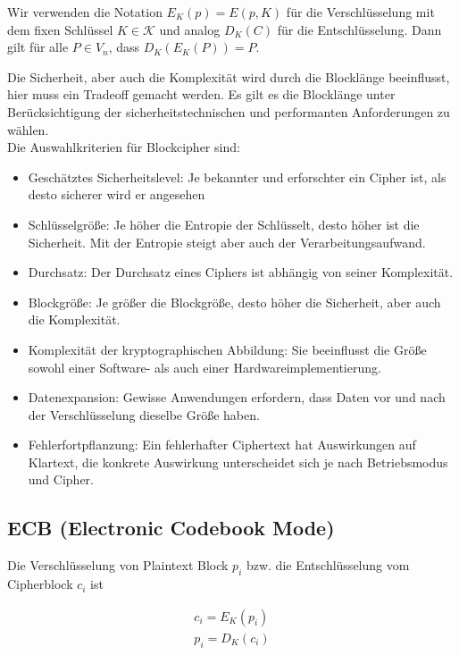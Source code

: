 Wir verwenden die Notation $E_K(p) = E(p, K)$ für die Verschlüsselung mit dem fixen Schlüssel $K \in \mathcal{K}$ und analog $D_K(C)$ für die Entschlüsselung. Dann gilt 
für alle $P \in V_n$, dass $D_K(E_K(P)) = P$.

Die Sicherheit, aber auch die Komplexität wird durch die Blocklänge beeinflusst, hier muss ein Tradeoff gemacht werden. Es gilt es die Blocklänge unter Berücksichtigung 
der sicherheitstechnischen und performanten Anforderungen zu wählen. \\

Die Auswahlkriterien für Blockcipher sind:

\begin{itemize}
    \item Geschätztes Sicherheitslevel: Je bekannter und erforschter ein Cipher ist, als desto sicherer wird er angesehen
    \item Schlüsselgröße: Je höher die Entropie der Schlüsselt, desto höher ist die Sicherheit. Mit der Entropie steigt aber auch der Verarbeitungsaufwand.
    \item Durchsatz: Der Durchsatz eines Ciphers ist abhängig von seiner Komplexität.
    \item Blockgröße: Je größer die Blockgröße, desto höher die Sicherheit, aber auch die Komplexität.
    \item Komplexität der kryptographischen Abbildung: Sie beeinflusst die Größe sowohl einer Software- als auch einer Hardwareimplementierung.
    \item Datenexpansion: Gewisse Anwendungen erfordern, dass Daten vor und nach der Verschlüsselung dieselbe Größe haben.
    \item Fehlerfortpflanzung: Ein fehlerhafter Ciphertext hat Auswirkungen auf Klartext, die konkrete Auswirkung unterscheidet sich je nach Betriebsmodus und Cipher.
\end{itemize}

\subsection{ECB (Electronic Codebook Mode)}

Die Verschlüsselung von Plaintext Block $p_i$ bzw. die Entschlüsselung vom Cipherblock $c_i$ ist

\begin{align*}
    c_i = E_K(p_i) \\
    p_i = D_K(c_i)
\end{align*}

